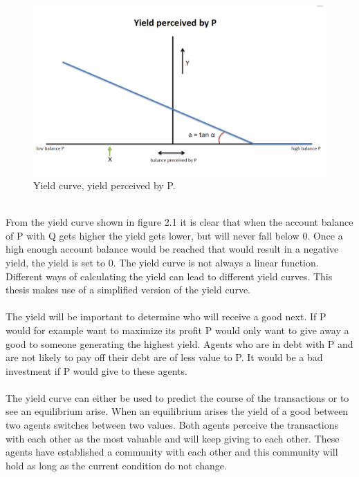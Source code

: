 \documentclass[twoside,openright]{uva-bachelor-thesis}
\begin{document}
\\
\begin{figure}[h!]
\centering
\includegraphics[scale=0.4]{YieldCurves/yieldcurve_P}
\caption{Yield curve, yield perceived by P.}
\end{figure}
\\
From the yield curve shown in figure 2.1 it is clear that when the account balance of P with Q gets higher the yield gets lower, but will never fall below 0. Once a high enough account balance would be reached that would result in a negative yield, the yield is set to 0. The yield curve is not always a linear function. Different ways of calculating the yield can lead to different yield curves. This thesis makes use of a simplified version of the yield curve.
\\
\\
The yield will be important to determine who will receive a good next. If P would for example want to maximize its profit P would only want to give away a good to someone generating the highest yield. Agents who are in debt with P and are not likely to pay off their debt are of less value to P. It would be a bad investment if P would give to these agents.
\\
\\
The yield curve can either be used to predict the course of the transactions or to see an equilibrium arise. When an equilibrium arises the yield of a good between two agents switches between two values. Both agents perceive the transactions with each other as the most valuable and will keep giving to each other. These agents have established a community with each other and this community will hold as long as the current condition do not change. 
\end{document}
